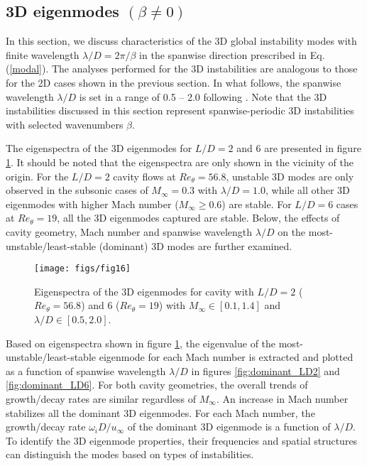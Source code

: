 \documentclass{jfm}
\begin{document}
\subsection{3D eigenmodes $(\beta \ne 0)$}\label{sec:global3D}

In this section, we discuss characteristics of the 3D global instability modes with finite wavelength $\lambda/D=2\pi/\beta$ in the spanwise direction prescribed in Eq. (\ref{modal}). The analyses performed for the 3D instabilities are analogous to those for the 2D cases shown in the previous section. In what follows, the spanwise wavelength $\lambda/D$ is set in a range of 0.5 -- 2.0 following \cite{Bres:JFM08}. Note that the 3D instabilities discussed in this section represent spanwise-periodic 3D instabilities with selected wavenumbers $\beta$. 

The eigenspectra of the 3D eigenmodes  for $L/D=2$ and 6 are presented in figure \ref{fig:3DspectraLD}. It should be noted that the eigenspectra are only shown in the vicinity of the origin. For the $L/D=2$ cavity flows at $Re_\theta=56.8$, unstable 3D modes are only observed in the subsonic cases of $M_\infty=0.3$ with $\lambda/D =1.0$, while all other 3D eigenmodes with higher Mach number ($M_\infty \ge 0.6$) are stable.  For $L/D=6$ cases at $Re_\theta=19$, all the 3D eigenmodes captured are stable. Below, the effects of cavity geometry, Mach number and spanwise wavelength $\lambda/D$ on the most-unstable/least-stable (dominant) 3D modes are further examined. 
\begin{figure}
\begin{center}
   \texttt{[image: figs/fig16]}
   \caption{Eigenspectra of the 3D eigenmodes for cavity with $L/D=2$ ($Re_\theta=56.8$) and 6 ($Re_\theta=19$) with $M_\infty \in[0.1,1.4]$ and $ \lambda/D \in [0.5,2.0]$.} 
      \label{fig:3DspectraLD} 
\end{center}
\end{figure}

Based on eigenspectra shown in figure \ref{fig:3DspectraLD}, the eigenvalue of the most-unstable/least-stable eigenmode for each Mach number is extracted and plotted as a function of spanwise wavelength $\lambda/D$ in figures \ref{fig:dominant_LD2} and \ref{fig:dominant_LD6}. For both cavity geometries, the overall trends of growth/decay rates are similar regardless of $M_\infty$. An increase in Mach number stabilizes all the dominant 3D eigenmodes. For each Mach number, the growth/decay rate $\omega_iD/u_\infty$ of the dominant 3D eigenmode is a function of $\lambda/D$. To identify the 3D eigenmode properties, their frequencies and spatial structures can distinguish the modes based on types of instabilities. 
\end{document}
